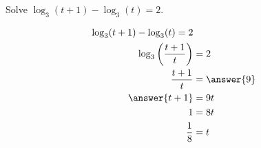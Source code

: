 \documentclass{ximera}
\author{Lee Wayand}
\begin{document}
\begin{exercise}



\begin{question}


Solve $\log_3(t+1) - \log_3(t) = 2$.








\begin{align*}
\log_3(t+1) - \log_3(t) = 2   \\
\log_3 \left( \frac{t+1}{t} \right)  & = 2  \\
\frac{t+1}{t} & = \answer{9}  \\
\answer{t+1} & = 9t  \\
1 & = 8t  \\
\frac{1}{8} & = t
\end{align*}





\end{question}












\end{exercise}
\end{document}
